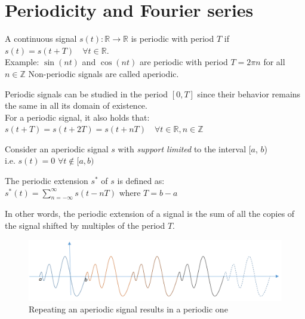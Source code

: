 \section{Periodicity and Fourier series}

\begin{definition}
   
   A continuous signal $s(t): \mathbb{R} \rightarrow \mathbb{R}$ is periodic with period $T$ if
   $s(t) = s(t + T) \quad \forall t \in \mathbb{R}$.\\
   Example: $\sin(nt)$ and $\cos(nt)$ are periodic with period $T = 2\pi n$ for all $n \in \mathbb{Z}$
   Non-periodic signals are called aperiodic.

   Periodic signals can be studied in the period $[0, T]$ since their behavior remains the same in all its domain of existence.\\
   For a periodic signal, it also holds that:
   $s(t + T) = s(t + 2T) = s(t + nT) \quad \forall t \in \mathbb{R}, n \in \mathbb{Z}$
\end{definition}

\begin{definition}
   
   Consider an aperiodic signal $s$ with \textit{support limited} to the interval [$a$, $b$)\\
   i.e. $s(t) = 0$ $\forall t \notin [a, b)$
   
   The periodic extension $s^*$ of $s$ is defined as:
   $s^*(t) = \sum_{n=-\infty}^{\infty} s(t - nT) \text{ where } T = b - a$
   
\end{definition}

In other words, the periodic extension of a signal is the sum of all the copies of the signal shifted by multiples of the period $T$.

\begin{figure}[htbp]
   \centering
   \includegraphics{images/signals_aperiodic.png}
   \caption{Repeating an aperiodic signal results in a periodic one}
   \label{fig:signals_aperiodic}
\end{figure}



